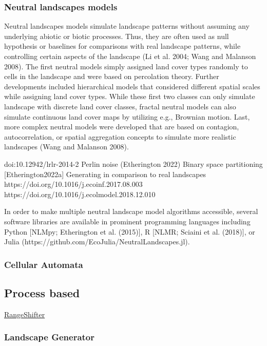 \documentclass[
  12pt,
  a4paperpaper,
]{article}
\begin{document}
\subsubsection{Neutral landscapes
models}\label{neutral-landscapes-models}

Neutral landscapes models simulate landscape patterns without assuming
any underlying abiotic or biotic processes. Thus, they are often used as
null hypothesis or baselines for comparisons with real landscape
patterns, while controlling certain aspects of the landscape (Li et al.
2004; Wang and Malanson 2008). The first neutral models simply assigned
land cover types randomly to cells in the landscape and were based on
percolation theory. Further developments included hierarchical models
that considered different spatial scales while assigning land cover
types. While these first two classes can only simulate landscape with
discrete land cover classes, fractal neutral models can also simulate
continuous land cover maps by utilizing e.g., Brownian motion. Last,
more complex neutral models were developed that are based on contagion,
autocorrelation, or spatial aggregation concepts to simulate more
realistic landscapes (Wang and Malanson 2008).

doi:10.12942/lrlr-2014-2 Perlin noise (Etherington 2022) Binary space
partitioning {[}Etherington2022a{]} Generating in comparison to real
landscapes https://doi.org/10.1016/j.ecoinf.2017.08.003
https://doi.org/10.1016/j.ecolmodel.2018.12.010

In order to make multiple neutral landscape model algorithms accessible,
several software libraries are available in prominent programming
languages including Python {[}NLMpy; Etherington et al. (2015){]}, R
{[}NLMR; Sciaini et al. (2018){]}, or Julia
(https://github.com/EcoJulia/NeutralLandscapes.jl).

\subsubsection{Cellular Automata}\label{cellular-automata}

\subsection{Process based}\label{process-based}

\href{https://doi.org/10.1111/ecog.05687}{RangeShifter}

\subsubsection{Landscape Generator}\label{landscape-generator}
\end{document}
